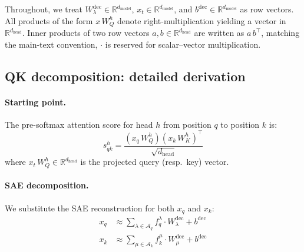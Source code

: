\documentclass{article}
\theoremstyle{plain}
\theoremstyle{definition}
\theoremstyle{remark}
\newcommand{\Wdec}{W^{\mathrm{dec}}}
\newcommand{\WQ}{W_Q}
\newcommand{\WK}{W_K}
\newcommand{\dmodel}{d_{\mathrm{model}}}
\newcommand{\dhead}{d_{\mathrm{head}}}
\newcommand{\RR}{\mathbb{R}}
\begin{document}
Throughout, we treat $\Wdec_\lambda \in \RR^{\dmodel}$, $x_t \in \RR^{\dmodel}$, and $b^{\mathrm{dec}} \in \RR^{\dmodel}$ as row vectors. All products of the form $x\,\WQ^h$ denote right-multiplication yielding a vector in $\RR^{\dhead}$. Inner products of two row vectors $a, b \in \RR^{\dhead}$ are written as $a\,b^\top$, matching the main-text convention, $\cdot$ is reserved for scalar--vector multiplication.

\subsection{QK decomposition: detailed derivation}
\label{app:qk_derivation}

\paragraph{Starting point.} The pre-softmax attention score for head $h$ from position $q$ to position $k$ is:
\begin{equation}
    s^h_{qk} = \frac{\left(x_q\,\WQ^h\right) \left(x_k\,\WK^h\right)^\top}{\sqrt{\dhead}}
\end{equation}
where $x_t\,\WQ^h \in \RR^{\dhead}$ is the projected query (resp.\ key) vector.

\paragraph{SAE decomposition.} We substitute the SAE reconstruction for both $x_q$ and $x_k$:
\begin{align}
    x_q &\approx \sum_{\lambda \in \mathcal{A}_q} f_q^\lambda \cdot \Wdec_\lambda + b^{\mathrm{dec}} \\
    x_k &\approx \sum_{\mu \in \mathcal{A}_k} f_k^\mu \cdot \Wdec_\mu + b^{\mathrm{dec}}
\end{align}
\end{document}
